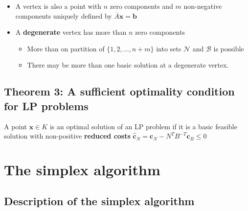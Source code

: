 \documentclass[11pt,a4paper]{article}
\begin{document}
\begin{itemize}

    \item A vertex is also a point with $n$ zero components and $m$ non-negative components
        uniquely defined by $\overline{A}\textbf{x} = \textbf{b}$

    \item A \textbf{degenerate} vertex has more than $n$ zero components
        \begin{itemize}
            \item More than on partition of $\{1, 2, \ldots, n+m\}$ into sets $\mathcal{N}$ and
                $\mathcal{B}$ is possible
            \item There may be more than one basic solution at a degenerate vertex.
        \end{itemize}

\end{itemize}

\subsection*{Theorem 3: A sufficient optimality condition for LP problems}

A point $\textbf{x} \in K$ is an optimal solution of an LP problem if it is a basic feasible
solution with non-positive \textbf{reduced costs}
$\widehat{\textbf{c}}_N = \textbf{c}_N - N^{T}B^{-T}\textbf{c}_B \le 0$

\section*{The simplex algorithm}

\subsection*{Description of the simplex algorithm}
\end{document}
